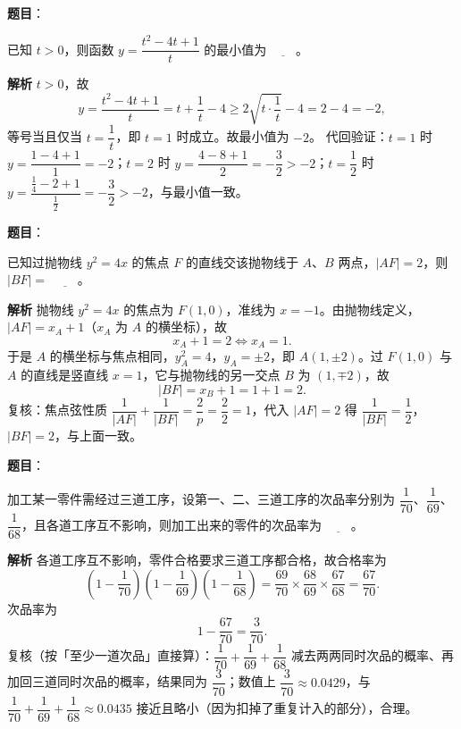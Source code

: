 \begin{answer}

\textbf{题目}：

已知 $t>0$，则函数 $y=\dfrac{t^2-4t+1}{t}$ 的最小值为 $\underline{\qquad}$。

\textbf{解析}
$t>0$，故
\nopagebreak[4]
\[y=\frac{t^2-4t+1}{t}=t+\frac1t-4\geqslant2\sqrt{t\cdot\frac1t}-4=2-4=-2,\]
等号当且仅当 $t=\dfrac1t$，即 $t=1$ 时成立。故最小值为 $-2$。
代回验证：$t=1$ 时 $y=\dfrac{1-4+1}{1}=-2$；$t=2$ 时 $y=\dfrac{4-8+1}{2}=-\dfrac32>-2$；$t=\dfrac12$ 时 $y=\dfrac{\frac14-2+1}{\frac12}=-\dfrac32>-2$，与最小值一致。


\end{answer}
\begin{answer}

\textbf{题目}：

已知过抛物线 $y^2=4x$ 的焦点 $F$ 的直线交该抛物线于 $A$、$B$ 两点，$|AF|=2$，则 $|BF|=$ $\underline{\qquad}$。

\textbf{解析}
抛物线 $y^2=4x$ 的焦点为 $F(1,0)$，准线为 $x=-1$。由抛物线定义，$|AF|=x_A+1$（$x_A$ 为 $A$ 的横坐标），故
\nopagebreak[4]
\[x_A+1=2\iff x_A=1.\]
于是 $A$ 的横坐标与焦点相同，$y_A^2=4$，$y_A=\pm2$，即 $A(1,\pm2)$。过 $F(1,0)$ 与 $A$ 的直线是竖直线 $x=1$，它与抛物线的另一交点 $B$ 为 $(1,\mp2)$，故
\nopagebreak[4]
\[|BF|=x_B+1=1+1=2.\]
复核：焦点弦性质 $\dfrac{1}{|AF|}+\dfrac{1}{|BF|}=\dfrac{2}{p}=\dfrac{2}{2}=1$，代入 $|AF|=2$ 得 $\dfrac{1}{|BF|}=\dfrac12$，$|BF|=2$，与上面一致。


\end{answer}
\begin{answer}

\textbf{题目}：

加工某一零件需经过三道工序，设第一、二、三道工序的次品率分别为 $\dfrac{1}{70}$、$\dfrac{1}{69}$、$\dfrac{1}{68}$，且各道工序互不影响，则加工出来的零件的次品率为 $\underline{\qquad}$。

\textbf{解析}
各道工序互不影响，零件合格要求三道工序都合格，故合格率为
\nopagebreak[4]
\[\left(1-\frac{1}{70}\right)\left(1-\frac{1}{69}\right)\left(1-\frac{1}{68}\right)=\frac{69}{70}\times\frac{68}{69}\times\frac{67}{68}=\frac{67}{70}.\]
次品率为
\nopagebreak[4]
\[1-\frac{67}{70}=\frac{3}{70}.\]
复核（按「至少一道次品」直接算）：$\dfrac{1}{70}+\dfrac{1}{69}+\dfrac{1}{68}$ 减去两两同时次品的概率、再加回三道同时次品的概率，结果同为 $\dfrac{3}{70}$；数值上 $\dfrac{3}{70}\approx0.0429$，与 $\dfrac{1}{70}+\dfrac{1}{69}+\dfrac{1}{68}\approx0.0435$ 接近且略小（因为扣掉了重复计入的部分），合理。


\end{answer}
